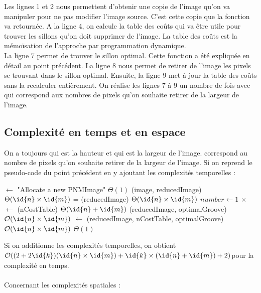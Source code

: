 \documentclass[a4paper, 11pt, oneside]{article}
\begin{document}
Les lignes 1 et 2 nous permettent d'obtenir une copie de l'image qu'on va manipuler pour ne pas modifier l'image source. C'est cette copie que la fonction va retournée.
A la ligne 4, on calcule la table des coûts qui va être utile pour trouver les sillons qu'on doit supprimer de l'image. La table des coûts est la mémoïsation de l'approche par programmation dynamique.\\
La ligne 7 permet de trouver le sillon optimal. Cette fonction a été expliquée en détail au point précédent. La ligne 8 nous permet de retirer de l'image les pixels se trouvant dans le sillon optimal. Ensuite, la ligne 9 met à jour la table des coûts sans la recalculer entièrement. On réalise les lignes 7 à 9 un nombre  de fois avec  qui correspond aux nombres de pixels qu'on souhaite retirer de la largeur de l'image.

\subsection{Complexité en temps et en espace}
On a toujours  qui est la hauteur et  qui est la largeur de l'image.  correspond au nombre de pixels qu'on souhaite retirer de la largeur de l'image. Si on reprend le pseudo-code du point précédent en y ajoutant les complexités temporelles :
\begin{codebox} %
        \li {} $\gets$ "Allocate a new PNMImage" \Comment $\Theta(1)$
        \li {}(image, reducedImage) \Comment $\Theta(\id{n} \times \id{m})$
        \li {} = (reducedImage) \Comment $\Theta(\id{n} \times \id{m})$
        \li
	    \li \For $number \gets 1$ \To {} \Comment {} $\times$
                \Do
         \li    	{} $\gets$ (nCostTable) \Comment $\Theta(\id{n} + \id{m})$
         \li		{}(reducedImage, optimalGroove) \Comment $\mathcal{O}(\id{n} \times \id{m})$
         \li		{} $\gets$ (reducedImage, nCostTable, optimalGroove) \Comment $\mathcal{O}(\id{n} \times \id{m})$
                \End
        \li
        \li \Return {} \Comment $\Theta(1)$
\end{codebox}

Si on additionne les complexités temporelles, on obtient $\mathcal{O}((2+2\id{k})(\id{n} \times \id{m}) + \id{k} \times (\id{n} + \id{m}) + 2)$pour la complexité en temps.\\
\\
\noindent Concernant les complexités spatiales :
\end{document}
